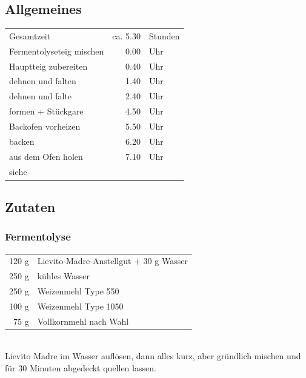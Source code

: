 \documentclass[10pt,a4paper,ngerman, DIV=16]{scrartcl}
\begin{document}
\subsection*{Allgemeines}
\begin{tabular}{lrl}
    Gesamtzeit               &                ca. 5.30 & Stunden \\
    Fermentolyseteig mischen &                    0.00 & Uhr     \\
    Hauptteig zubereiten     &                    0.40 & Uhr     \\
    dehnen und falten        &                    1.40 & Uhr     \\
    dehnen und falte         &                    2.40 & Uhr     \\
    formen + Stückgare       &                    4.50 & Uhr     \\
    Backofen vorheizen       &                    5.50 & Uhr     \\
    backen                   &                    6.20 & Uhr     \\
    aus dem Ofen holen       &                    7.10 & Uhr     \\
    siehe                    & \cite{SonjaBauer2021} &
\end{tabular}

\subsection*{Zutaten}
\subsubsection*{\Gls{Fermentolyse}}
\begin{tabular}{r l}
    120 g & Lievito-Madre-Anstellgut + 30 g Wasser\\
    250 g & kühles Wasser\\
    250 g & Weizenmehl Type 550\\
    100 g & Weizenmehl Type 1050\\
    75  g & Vollkornmehl nach Wahl\\
\end{tabular}\\
Lievito Madre im Wasser auflösen, dann alles kurz, aber gründlich mischen und für 30 Minuten abgedeckt quellen lassen.
\end{document}
